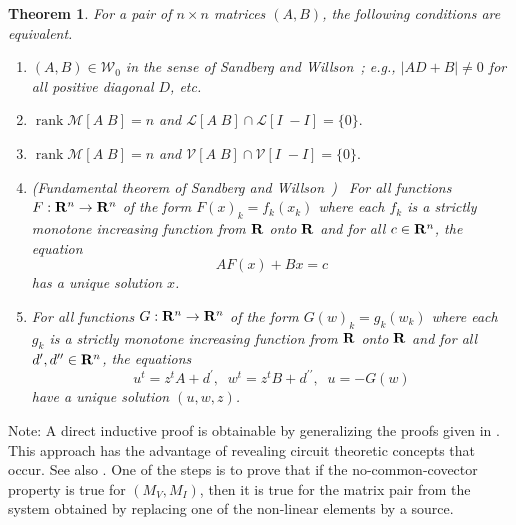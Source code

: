 \documentclass{article}
\newtheorem{theorem}{Theorem}
\DeclareMathOperator{\rank}{rank}
\newcommand{\hmat}[2]{[#1\;#2]}
\begin{document}
\begin{theorem}
\label{sandwillompairtheorem}
For a pair 
%
%
of $n\times n$ 
matrices $(A,B)$, the following conditions are 
equivalent.
%
%
\begin{enumerate}
\item 
$(A,B)\in {\mathcal W}_0$ in the sense of 
Sandberg and 
Willson~\cite{SWExistancePf,W0APPLpaper};
e.g., $|AD+B|\neq 0$ for all positive diagonal $D$, etc.
\item 
$\rank{\mathcal M}\hmat{A}{B}=n$ and 
${\mathcal L}\hmat{A}{B} \cap {\mathcal L}\hmat{I}{-I}=\{0\}.$
\item 
$\rank{\mathcal M}\hmat{A}{B}=n$ and 
${\mathcal V}\hmat{A}{B} \cap {\mathcal V}\hmat{I}{-I}=\{0\}.$
\item 
\textrm{(}Fundamental theorem of Sandberg and 
Willson~\cite{SWExistancePf,W0APPLpaper}\textrm{)}\ 
%
%
For all functions $F:{\bf R}^n\rightarrow {\bf R}^n$ of the form
$F(x)_k=f_k(x_k)$ where each $f_k$ is a strictly 
monotone increasing 
function from 
${\bf R}$ {\em onto} $\bf R$ and for all $c\in {\bf R}^n$, the 
equation
\[
AF(x) + Bx = c
\]
has a unique solution $x$.%
\item 
For all functions $G:{\bf R}^n\rightarrow {\bf R}^n$ of the form
$G(w)_k=g_k(w_k)$ where each $g_k$ is a strictly monotone increasing 
function from ${\bf R}$ {\em onto} $\bf R$ and for all 
$d^{\prime}, d^{\prime\prime}\in {\bf R}^n$, the 
equations
\begin{equation}
\label{W0dualproblem}
u^t=z^tA+d^{\prime},\;\; w^t=z^tB+d^{\prime\prime},\;\; u=-G(w)
\end{equation}
have a unique solution $(u,w,z)$.
\end{enumerate}
\end{theorem}

Note:  A direct inductive proof is obtainable by generalizing 
the proofs given in \cite{HaslerNeirynck}.  This approach has the advantage
of revealing circuit theoretic concepts that occur.  See also
\cite{Fosseprez}.  One of the steps is to prove that if the no-common-covector
property is true for $(M_V,M_I)$, then it is true for the matrix pair 
from the system obtained by replacing one of the non-linear elements by a
source.
\end{document}
